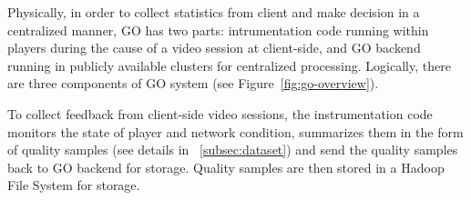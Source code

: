  Physically, in order to collect statistics from client and make decision in a centralized manner, GO has two parts: intrumentation code running within players during the cause of a video session at client-side, and GO backend running in publicly available clusters for centralized processing. Logically, there are three components of GO system (see Figure~\ref{fig:go-overview}). 

 To collect feedback from client-side video sessions, the instrumentation code monitors the state of player and network condition, summarizes them in the form of quality samples (see details in \Section~\ref{subsec:dataset}) and send the quality samples back to GO backend for storage. Quality samples are then stored in a Hadoop File System for storage. 






